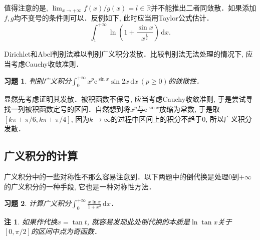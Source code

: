 \documentclass[11pt,a4paper]{ctexart}
\makeatletter
\theoremstyle{thmseries} %
\theoremstyle{exerseries}
\newtheorem{exer}{习题}[section]
\newtheorem*{rem}{注}
\renewenvironment{proof}[1][\proofname]{\par
  \pushQED{\qed}%
  \normalfont \topsep6\p@\@plus6\p@\relax
  \trivlist
  \item[\hskip\labelsep
        \itshape
    #1\@addpunct{}]\ignorespaces
}{%
  \popQED\endtrivlist\@endpefalse
}
\newenvironment{sol}{\begin{proof}[\bfseries\upshape 解\quad]}{\end{proof}}
\newcommand{\bra}[1]{\mathopen{}\left(#1\right)}
\newcommand{\sbra}[1]{\mathopen{}\left[#1\right]}
\newcommand{\R}{\mathbb{R}}
\renewcommand{\d}{\mathrm{d}}
\newcommand{\e}{\mathrm{e}}
\makeatother
\begin{document}

值得注意的是, $\lim_{x\to+\infty}f(x)/g(x)=l\in\R$并不能推出二者同敛散．如果添加$f,g$均不变号的条件则可以．反例如下, 此时应当用Taylor公式估计．
\[\int_{1}^{+\infty}\ln\bra{1+\frac{\sin x}{x^\frac{1}{2}}}\,\d x.\]

Dirichlet和Abel判别法难以判别广义积分发散．比较判别法无法处理的情况下, 应当考虑Cauchy收敛准则．
\begin{exer}
	判别广义积分$\int_{0}^{+\infty}x^p\e^{\sin x}\sin 2x\,\d x\,(p\geq0)$的敛散性．
\end{exer}
\begin{sol}
	显然先考虑证明其发散．被积函数不保号, 应当考虑Cauchy收敛准则, 于是尝试寻找一列被积函数定号的区间．自然想到将$x^p$与$\e^{\sin x}$放缩为常数, 于是取$[k\pi+\pi/6,k\pi+\pi/4]$, 因为$k\to\infty$的过程中区间上的积分不趋于$0$, 所以广义积分发散．
\end{sol}


\subsection{广义积分的计算}
广义积分中的一些对称性不那么容易注意到．以下两题中的倒代换是处理$0$到$+\infty$的广义积分的一种手段, 它也是一种对称性方法．
\begin{exer}
	计算广义积分$\int_{0}^{+\infty}\frac{x\ln x}{1+x^2}\,\d x$．
\end{exer}
\begin{rem}
	如果作代换$x=\tan t$, 就容易发现此处倒代换的本质是$\ln\tan x$关于$[0,\pi/2]$的区间中点为奇函数．
\end{rem}
\end{document}
